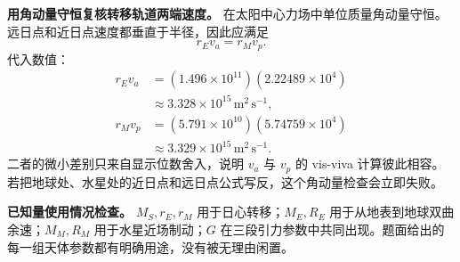 \documentclass[12pt,a4paper,UTF8]{ctexart}
\begin{document}
\textbf{用角动量守恒复核转移轨道两端速度。}
在太阳中心力场中单位质量角动量守恒。远日点和近日点速度都垂直于半径，因此应满足
\[
r_Ev_a=r_Mv_p.
\] 代入数值： \[
\begin{aligned}
r_Ev_a
&=(1.496\times10^{11})
(2.22489\times10^4)\\
&\approx3.328\times10^{15}\,\mathrm{m^2\,s^{-1}},
\\
r_Mv_p
&=(5.791\times10^{10})
(5.74759\times10^4)\\
&\approx3.329\times10^{15}\,\mathrm{m^2\,s^{-1}}.
\end{aligned}
\] 二者的微小差别只来自显示位数舍入，说明 \(v_a\) 与 \(v_p\) 的 vis-viva
计算彼此相容。若把地球处、水星处的近日点和远日点公式写反，这个角动量检查会立即失败。

\textbf{已知量使用情况检查。} \(M_S,r_E,r_M\) 用于日心转移；\(M_E,R_E\)
用于从地表到地球双曲余速；\(M_M,R_M\) 用于水星近场制动；\(G\)
在三段引力参数中共同出现。题面给出的每一组天体参数都有明确用途，没有被无理由闲置。
\end{document}
